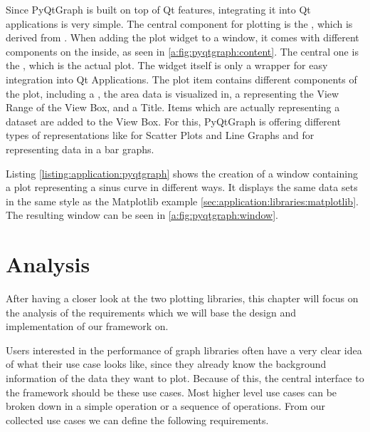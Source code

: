 Since PyQtGraph is built on top of Qt features, integrating it into Qt
applications is very simple. The central component for plotting is the
, which is derived from
. When adding the plot widget to a
window, it comes with different components on the inside, as seen in
\ref{a:fig:pyqtgraph:content}. The central one is the
, which is the actual plot. The widget
itself is only a wrapper for easy integration into Qt Applications. The plot
item contains different components of the plot, including a
, the area data is visualized in,
a  representing the View Range
of the View Box, and a Title. Items which are actually representing a dataset are
added to the View Box. For this, PyQtGraph is offering different types of
representations like  for Scatter
Plots and Line Graphs and  for
representing data in a bar graphs.

Listing \ref{listing:application:pyqtgraph} shows the creation of a window
containing a plot representing a sinus curve in different ways. It displays the
same data sets in the same style as the Matplotlib example
\ref{sec:application:libraries:matplotlib}. The resulting window can be seen in
\ref{a:fig:pyqtgraph:window}.
\cite{PyQtGraphDoc}





\section{Analysis}
\label{sec:application:analysis}

After having a closer look at the two plotting libraries, this chapter will
focus on the analysis of the requirements which we will base the design and
implementation of our framework on.

Users interested in the performance of graph libraries often have a very clear
idea of what their use case looks like, since they already know the background
information of the data they want to plot. Because of this, the central
interface to the framework should be these use cases. Most higher level use
cases can be broken down in a simple operation or a sequence of operations. From
our collected use cases we can define the following requirements.

